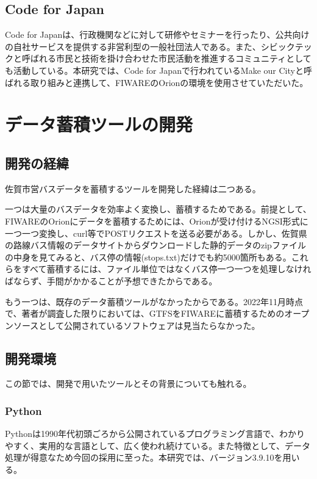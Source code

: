\documentclass[a4paper, 12pt]{jsreport}
\begin{document}
  \section{Code for Japan}
  \par Code for Japanは、行政機関などに対して研修やセミナーを行ったり、公共向けの自社サービスを提供する非営利型の一般社団法人である。また、シビックテックと呼ばれる市民と技術を掛け合わせた市民活動を推進するコミュニティとしても活動している。本研究では、Code
  for Japanで行われているMake our Cityと呼ばれる取り組みと連携して、FIWAREのOrionの環境を使用させていただいた。

  \chapter{データ蓄積ツールの開発}
  \section{開発の経緯}
  \par 佐賀市営バスデータを蓄積するツールを開発した経緯は二つある。 \par
  一つは大量のバスデータを効率よく変換し、蓄積するためである。前提として、FIWAREのOrionにデータを蓄積するためには、Orionが受け付けるNGSI形式に一つ一つ変換し、curl等でPOSTリクエストを送る必要がある。しかし、佐賀県の路線バス情報のデータサイトからダウンロードした静的データのzipファイルの中身を見てみると、バス停の情報(stops.txt)だけでも約5000箇所もある。これらをすべて蓄積するには、ファイル単位ではなくバス停一つ一つを処理しなければならず、手間がかかることが予想できたからである。
  \par
  もう一つは、既存のデータ蓄積ツールがなかったからである。2022年11月時点で、著者が調査した限りにおいては、GTFSをFIWAREに蓄積するためのオープンソースとして公開されているソフトウェアは見当たらなかった。

  \section{開発環境}
  この節では、開発で用いたツールとその背景についても触れる。
  \subsection{Python}
  \par Pythonは1990年代初頭ごろから公開されているプログラミング言語で、わかりやすく、実用的な言語として、広く使われ続けている。また特徴として、データ処理が得意なため今回の採用に至った。本研究では、バージョン3.9.10を用いる。
\end{document}
